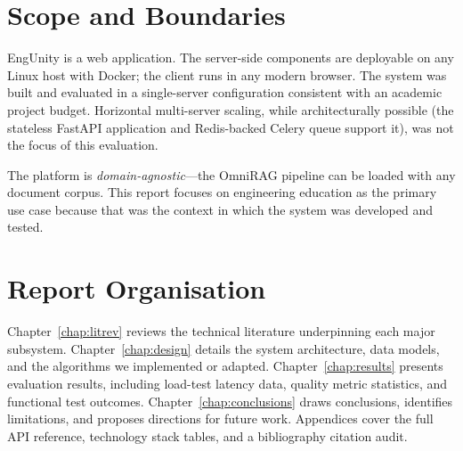 \section{Scope and Boundaries}
\label{sec:scope}

EngUnity is a web application. The server-side components are deployable on any
Linux host with Docker; the client runs in any modern browser. The system was
built and evaluated in a single-server configuration consistent with an academic
project budget. Horizontal multi-server scaling, while architecturally possible
(the stateless FastAPI application and Redis-backed Celery queue support it), was
not the focus of this evaluation.

The platform is \textit{domain-agnostic}---the OmniRAG pipeline can be loaded with
any document corpus. This report focuses on engineering education as the primary
use case because that was the context in which the system was developed and tested.

\section{Report Organisation}
\label{sec:structure}

Chapter~\ref{chap:litrev} reviews the technical literature underpinning each
major subsystem. Chapter~\ref{chap:design} details the system architecture,
data models, and the algorithms we implemented or adapted. Chapter~\ref{chap:results}
presents evaluation results, including load-test latency data, quality metric
statistics, and functional test outcomes. Chapter~\ref{chap:conclusions} draws
conclusions, identifies limitations, and proposes directions for future work.
Appendices cover the full API reference, technology stack tables, and a
bibliography citation audit.
